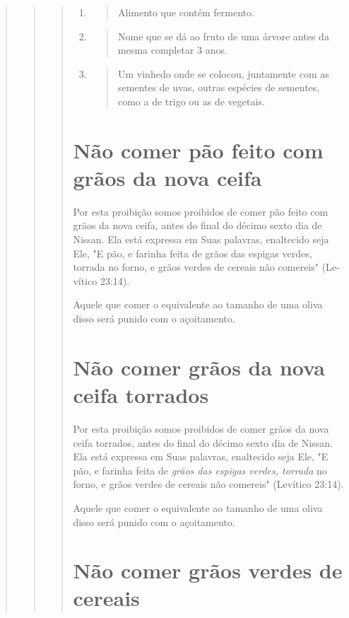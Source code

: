 \begin{quote}
\begin{quote}
\begin{quote}
\begin{enumerate}
\def\labelenumi{\arabic{enumi}.}
\setcounter{enumi}{357}
\item
 \begin{quote}
 Alimento que contém fermento.
 \end{quote}
\item
 \begin{quote}
 Nome que se dá ao fruto de uma árvore antes da mesma completar 3 anos.
 \end{quote}
\item
 \begin{quote}
 Um vinhedo onde se colocou, juntamente com as sementes de uvas, outras
 espécies de se­mentes, como a de trigo ou as de vegetais.
 \end{quote}
\end{enumerate}

\section{Não comer pão feito com grãos da nova ceifa}

Por esta proibição somos proibidos de comer pão feito com grãos da nova
ceifa, antes do final do décimo sexto dia de Nissan. Ela está expressa
em Suas palavras, enaltecido seja Ele, "E pão, e farinha feita de grãos
das espigas verdes, torrada no forno, e grãos verdes de cereais não
comereis" (Le­vítico 23:14).

Aquele que comer o equivalente ao tamanho de uma oliva disso será punido
com o açoitamento.

\section{Não comer grãos da nova ceifa torrados}

Por esta proibição somos proibidos de comer grãos da nova ceifa
tor­rados, antes do final do décimo sexto dia de Nissan. Ela está
expressa em Suas palavras, enaltecido seja Ele, "E pão, e farinha feita
de \emph{grãos das espigas verdes, torrada} no forno, e grãos verdes de
cereais não comereis" (Levítico 23:14).

Aquele que comer o equivalente ao tamanho de uma oliva disso será punido
com o açoitamento.

\section{Não comer grãos verdes de cereais}


\end{quote}
\end{quote}
\end{quote}
